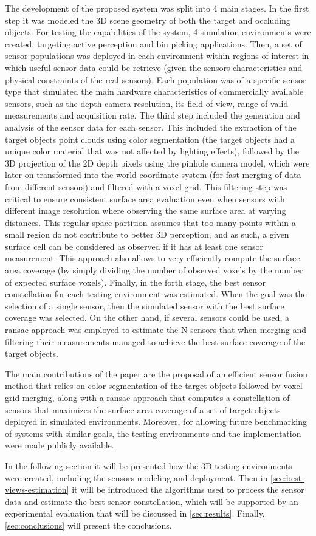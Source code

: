 The development of the proposed system was split into 4 main stages. In the first step it was modeled the 3D scene geometry of both the target and occluding objects. For testing the capabilities of the system, 4 simulation environments were created, targeting active perception and bin picking applications. Then, a set of sensor populations was deployed in each environment within regions of interest in which useful sensor data could be retrieve (given the sensors characteristics and physical constraints of the real sensors). Each population was of a specific sensor type that simulated the main hardware characteristics of commercially available sensors, such as the depth camera resolution, its field of view, range of valid measurements and acquisition rate. The third step included the generation and analysis of the sensor data for each sensor. This included the extraction of the target objects point clouds using color segmentation (the target objects had a unique color material that was not affected by lighting effects), followed by the 3D projection of the 2D depth pixels using the pinhole camera model, which were later on transformed into the world coordinate system (for fast merging of data from different sensors) and filtered with a voxel grid. This filtering step was critical to ensure consistent surface area evaluation even when sensors with different image resolution where observing the same surface area at varying distances. This regular space partition assumes that too many points within a small region do not contribute to better 3D perception, and as such, a given surface cell can be considered as observed if it has at least one sensor measurement. This approach also allows to very efficiently compute the surface area coverage (by simply dividing the number of observed voxels by the number of expected surface voxels). Finally, in the forth stage, the best sensor constellation for each testing environment was estimated. When the goal was the selection of a single sensor, then the simulated sensor with the best surface coverage was selected. On the other hand, if several sensors could be used, a \gls{ransac} approach was employed to estimate the N sensors that when merging and filtering their measurements managed to achieve the best surface coverage of the target objects.

The main contributions of the paper are the proposal of an efficient sensor fusion method that relies on color segmentation of the target objects followed by voxel grid merging, along with a \gls{ransac} approach that computes a constellation of sensors that maximizes the surface area coverage of a set of target objects deployed in simulated environments. Moreover, for allowing future benchmarking of systems with similar goals, the testing environments and the implementation were made publicly available.

In the following section it will be presented how the 3D testing environments were created, including the sensors modeling and deployment. Then in \cref{sec:best-views-estimation} it will be introduced the algorithms used to process the sensor data and estimate the best sensor constellation, which will be supported by an experimental evaluation that will be discussed in \cref{sec:results}. Finally, \cref{sec:conclusions} will present the conclusions.
